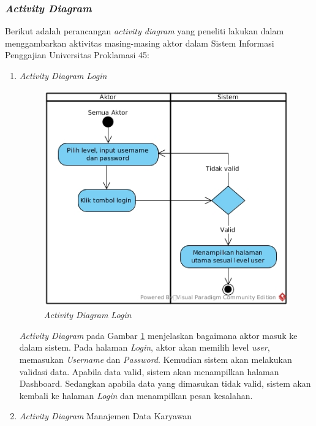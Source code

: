 			\subsubsection{\emph{Activity Diagram}}
			Berikut adalah perancangan \emph{activity diagram} yang peneliti lakukan dalam menggambarkan aktivitas masing-masing aktor dalam Sistem Informasi Penggajian Universitas Proklamasi 45:
			\begin{enumerate}
			    \itemsep0em
			    \item \emph{Activity Diagram Login}
			        \begin{figure}[H]
            		    \centering            		    \includegraphics[width=13cm]{gambar/activity/login-activity}
            		    \caption{\emph{Activity Diagram Login}}
            		    \label{activity_login}
            		\end{figure}
            		\emph{Activity Diagram} pada Gambar \ref{activity_login} menjelaskan bagaimana aktor masuk ke dalam sistem. Pada halaman \emph{Login}, aktor akan memilih level \emph{user}, memasukan \emph{Username} dan \emph{Password}. Kemudian sistem akan melakukan validasi data. Apabila data valid, sistem akan menampilkan halaman Dashboard. Sedangkan apabila data yang dimasukan tidak valid, sistem akan kembali ke halaman \emph{Login} dan menampilkan pesan kesalahan.\newpage
			    \item \emph{Activity Diagram} Manajemen Data Karyawan
			        \begin{figure}[H]

\end{figure}
\end{enumerate}
